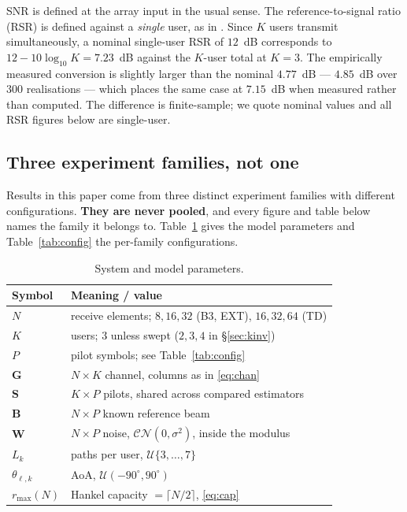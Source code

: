 \documentclass[journal]{IEEEtran}
\newcommand{\bG}{\mathbf{G}}
\newcommand{\bS}{\mathbf{S}}
\newcommand{\bB}{\mathbf{B}}
\newcommand{\bW}{\mathbf{W}}
\newcommand{\CN}{\mathcal{CN}}
\newcommand{\rmax}{r_{\max}}
\begin{document}
SNR is defined at the array input in the usual sense. The
reference-to-signal ratio (RSR) is defined against a \emph{single} user, as in
\cite{cui2025}. Since $K$ users transmit simultaneously, a nominal single-user
RSR of $12$~dB corresponds to $12-10\log_{10}K=7.23$~dB against the $K$-user
total at $K=3$.
The empirically measured conversion is slightly larger than the nominal
$4.77$~dB --- $4.85$~dB over $300$ realisations --- which places the same case
at $7.15$~dB when measured rather than computed. The difference is
finite-sample; we quote nominal values and all RSR figures below are
single-user.

\subsection{Three experiment families, not one}

Results in this paper come from three distinct experiment families with
different configurations. \textbf{They are never pooled}, and every figure and
table below names the family it belongs to. Table~\ref{tab:params} gives the
model parameters and Table~\ref{tab:config} the per-family configurations.

\begin{table}[!t]
\caption{System and model parameters.}
\label{tab:params}
\centering
\begin{tabular}{ll}
\toprule
Symbol & Meaning / value \\
\midrule
$N$ & receive elements; $8,16,32$ (B3, EXT), $16,32,64$ (TD) \\
$K$ & users; $3$ unless swept ($2,3,4$ in \S\ref{sec:kinv}) \\
$P$ & pilot symbols; see Table~\ref{tab:config} \\
$\bG$ & $N\times K$ channel, columns as in \eqref{eq:chan} \\
$\bS$ & $K\times P$ pilots, shared across compared estimators \\
$\bB$ & $N\times P$ known reference beam \\
$\bW$ & $N\times P$ noise, $\CN(0,\sigma^2)$, inside the modulus \\
$L_k$ & paths per user, $\mathcal{U}\{3,\dots,7\}$~\cite{xu2025} \\
$\theta_{\ell,k}$ & AoA, $\mathcal{U}(-90^\circ,90^\circ)$ \\
$\rmax(N)$ & Hankel capacity $=\lceil N/2\rceil$, \eqref{eq:cap} \\
\bottomrule
\end{tabular}
\end{table}
\end{document}

